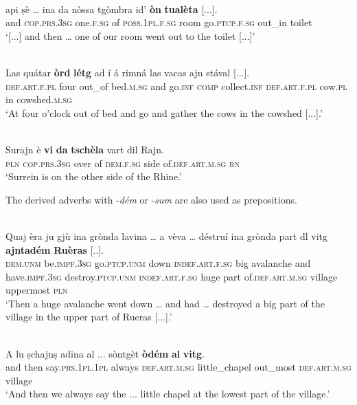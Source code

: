 \ea
\label{}
\\
\gll    [...] api ṣè …  ina da nòssa tgòmbra id’ \textbf{òn} \textbf{tualèta} [...].\\
{} and \textsc{cop.prs.3sg} {} one.\textsc{f.sg} of \textsc{poss.1pl.f.sg} room go.\textsc{ptcp.f.sg} out\_in toilet\\
\glt `[...] and then … one of our room went out to the toilet [...]'
\z

\ea
\label{}
\\
\gll Las quátar \textbf{òrd} \textbf{létg} ad í á rimná las vacas ajn stával [...].\\
\textsc{def.art.f.pl} four out\_of bed.\textsc{m.sg} and go.\textsc{inf} \textsc{comp} collect.\textsc{inf} \textsc{def.art.f.pl} cow.\textsc{pl} in cowshed.\textsc{m.sg}\\
\glt `At four o'clock out of bed and go and gather the cows in the cowshed [...].'
\z

\ea
\label{}
\\
\gll Surajn è \textbf{vi} \textbf{da} \textbf{tschèla} vart dil Rajn.\\
\textsc{pln} \textsc{cop.prs.3sg} over of \textsc{dem.f.sg} side of.\textsc{def.art.m.sg} \textsc{rn} \\
\glt `Surrein is on the other side of the Rhine.'
\z

The derived adverbs with -\textit{dém} or -\textit{sum} are also used as prepositions.

\ea
\label{}
\\
\gll    Quaj èra ju gjù ina grònda lavina … a vèva … déstruí ina grònda part dl vitg \textbf{ajntadém} \textbf{Ruèras} [..].\\
\textsc{dem.unm} be.\textsc{impf.3sg} go.\textsc{ptcp.unm} down \textsc{indef.art.f.sg} big avalanche {} and have.\textsc{impf.3sg} {} destroy.\textsc{ptcp.unm} \textsc{indef.art.f.sg} huge part of.\textsc{def.art.m.sg} village uppermost \textsc{pln}\\
\glt `Then a huge avalanche went down … and had … destroyed a big part of the village in the upper part of Rueras [...].'
\z

\ea
\label{}
\\
\gll A lu ṣchajnṣ adina al ... sòntgèt \textbf{òdém} \textbf{al} \textbf{vitg}.\\
and then say.\textsc{prs.1pl.1pl} always \textsc{def.art.m.sg} {} little\_chapel out\_most \textsc{def.art.m.sg} village\\
\glt `And then we always say the ... little chapel at the lowest part of the village.'
\z

